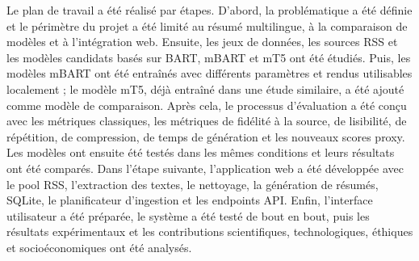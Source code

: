 Le plan de travail a été réalisé par étapes. D’abord, la problématique a été définie et le périmètre du projet a été limité au résumé multilingue, à la comparaison de modèles et à l’intégration web. Ensuite, les jeux de données, les sources RSS et les modèles candidats basés sur BART, mBART et mT5 ont été étudiés. Puis, les modèles mBART ont été entraînés avec différents paramètres et rendus utilisables localement ; le modèle mT5, déjà entraîné dans une étude similaire, a été ajouté comme modèle de comparaison. Après cela, le processus d’évaluation a été conçu avec les métriques classiques, les métriques de fidélité à la source, de lisibilité, de répétition, de compression, de temps de génération et les nouveaux scores proxy. Les modèles ont ensuite été testés dans les mêmes conditions et leurs résultats ont été comparés. Dans l’étape suivante, l’application web a été développée avec le pool RSS, l’extraction des textes, le nettoyage, la génération de résumés, SQLite, le planificateur d’ingestion et les endpoints API. Enfin, l’interface utilisateur a été préparée, le système a été testé de bout en bout, puis les résultats expérimentaux et les contributions scientifiques, technologiques, éthiques et socioéconomiques ont été analysés.